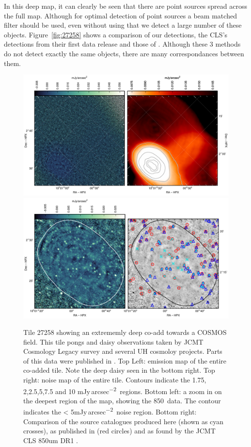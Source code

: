 \documentclass[twocolumn,times]{aastex6}
\newcommand{\jyas}{Jy\,arcsec\textsuperscript{$-$2}}
\begin{document}
In this deep map, it can clearly be seen that there are point sources
spread across the full map. Although for optimal detection of point
sources a beam matched filter should be used, even without using that
we detect a large number of these objects. Figure~\ref{fig:27258}
shows a comparison of our detections, the CLS's detections from their
first data release \citep{Geach2016} and those of
\citet{Casey2013}. Although these 3 methods do not detect exactly the
same objects, there are many correspondances between them.

\begin{figure}
  \includegraphics{27258-whole-map.pdf}
  \\[3mm]
  \includegraphics{27258-zoomin.pdf}
  \caption{Tile 27258 showing an extrememly deep co-add towards a
    COSMOS field. This tile pongs and daisy observations taken by JCMT
    Cosmology Legacy survey and several UH cosmoloy projects. Parts of
    this data were published in
    \citet{Casey2013,Chen2013,Chen2013a,Geach2016}. Top Left: emission
    map of the entire co-added tile. Note the deep daisy seen in the
    bottom right. Top right: noise map of the entire tile. Contours
    indicate the 1.75, 2,2.5,5,7.5 and 10 m\jyas\ regions. Bottom
    left: a zoom in on the deepest region of the map, showing the
    850\micron\ data. The contour indicates the < 5m\jyas\ noise
    region. Bottom right: Comparison of the source catalogues produced
    here (shown as cyan crosses), as published in \citealt{Casey2013}
    (red circles) and as found by the JCMT CLS 850um DR1 \citep[blue
    triangles]{Geach2016}. }
  \label{fig:t27258}
\end{figure}
\end{document}
